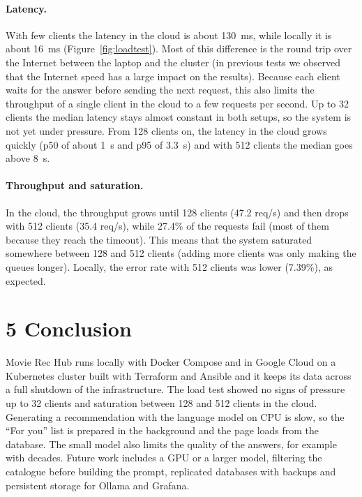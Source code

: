 \documentclass[10pt,a4paper]{article}
\begin{document}
\paragraph{Latency.} With few clients the latency in the cloud is about 130~ms, while locally it is about 16~ms (Figure~\ref{fig:loadtest}). Most of this difference is the round trip over the Internet between the laptop and the cluster (in previous tests we observed that the Internet speed has a large impact on the results). Because each client waits for the answer before sending the next request, this also limits the throughput of a single client in the cloud to a few requests per second. Up to 32 clients the median latency stays almost constant in both setups, so the system is not yet under pressure. From 128 clients on, the latency in the cloud grows quickly (p50 of about 1~s and p95 of 3.3~s) and with 512 clients the median goes above 8~s.

\paragraph{Throughput and saturation.} In the cloud, the throughput grows until 128 clients (47.2 req/s) and then drops with 512 clients (35.4 req/s), while 27.4\% of the requests fail (most of them because they reach the timeout). This means that the system saturated somewhere between 128 and 512 clients (adding more clients was only making the queues longer). Locally, the error rate with 512 clients was lower (7.39\%), as expected.

\section*{5 Conclusion}

Movie Rec Hub runs locally with Docker Compose and in Google Cloud on a Kubernetes cluster built with Terraform and Ansible and it keeps its data across a full shutdown of the infrastructure. The load test showed no signs of pressure up to 32 clients and saturation between 128 and 512 clients in the cloud. Generating a recommendation with the language model on CPU is slow, so the ``For you'' list is prepared in the background and the page loads from the database. The small model also limits the quality of the answers, for example with decades. Future work includes a GPU or a larger model, filtering the catalogue before building the prompt, replicated databases with backups and persistent storage for Ollama and Grafana.
\end{document}

